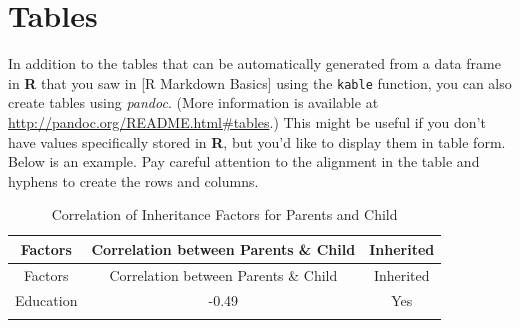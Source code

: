 \documentclass[12pt,twoside]{reedthesis}
\theoremstyle{definition}
\theoremstyle{definition}
\theoremstyle{definition}
\theoremstyle{remark}
\begin{document}
\section{Tables}\label{tables}

In addition to the tables that can be automatically generated from a
data frame in \textbf{R} that you saw in {[}R Markdown Basics{]} using
the \texttt{kable} function, you can also create tables using
\emph{pandoc}. (More information is available at
\url{http://pandoc.org/README.html\#tables}.) This might be useful if
you don't have values specifically stored in \textbf{R}, but you'd like
to display them in table form. Below is an example. Pay careful
attention to the alignment in the table and hyphens to create the rows
and columns.
\begin{longtable}[]{@{}ccc@{}}
\caption{\label{tab:inher} Correlation of Inheritance Factors for Parents
and Child}\tabularnewline
\toprule
\begin{minipage}[b]{0.29\columnwidth}\centering\strut
Factors\strut
\end{minipage} & \begin{minipage}[b]{0.47\columnwidth}\centering\strut
Correlation between Parents \& Child\strut
\end{minipage} & \begin{minipage}[b]{0.16\columnwidth}\centering\strut
Inherited\strut
\end{minipage}\tabularnewline
\midrule
\endfirsthead
\toprule
\begin{minipage}[b]{0.29\columnwidth}\centering\strut
Factors\strut
\end{minipage} & \begin{minipage}[b]{0.47\columnwidth}\centering\strut
Correlation between Parents \& Child\strut
\end{minipage} & \begin{minipage}[b]{0.16\columnwidth}\centering\strut
Inherited\strut
\end{minipage}\tabularnewline
\midrule
\endhead
\begin{minipage}[t]{0.29\columnwidth}\centering\strut
Education\strut
\end{minipage} & \begin{minipage}[t]{0.47\columnwidth}\centering\strut
-0.49\strut
\end{minipage} & \begin{minipage}[t]{0.16\columnwidth}\centering\strut
Yes\strut
\end{minipage}\tabularnewline
\begin{minipage}[t]{0.29\columnwidth}\centering\strut

\end{minipage}
\end{longtable}
\end{document}
